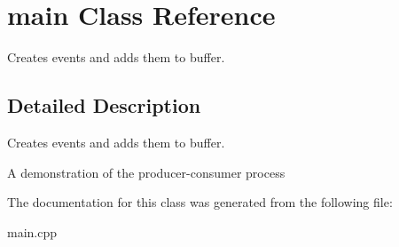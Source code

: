 \hypertarget{classmain}{}\section{main Class Reference}
\label{classmain}


Creates events and adds them to buffer.  




\subsection{Detailed Description}
Creates events and adds them to buffer. 

A demonstration of the producer-\/consumer process 

The documentation for this class was generated from the following file\+:\begin{DoxyCompactItemize}
\item 
main.\+cpp\end{DoxyCompactItemize}
